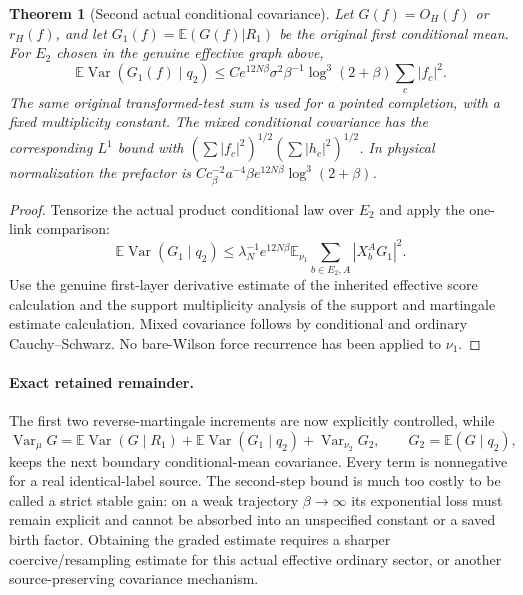 \documentclass[11pt]{article}
\newtheorem{theorem}{Theorem}
\newcommand{\E}{\mathbb E}
\newcommand{\Var}{\operatorname{Var}}
\begin{document}
\begin{theorem}[Second actual conditional covariance]
Let $G(f)=O_H(f)$ or $r_H(f)$, and let $G_1(f)=\E(G(f)|R_1)$ be the original first
conditional mean. For $E_2$ chosen in the genuine effective graph above,
\[
 \E\Var(G_1(f)\mid q_2)
 \le C e^{12N\beta}\sigma^2\beta^{-1}\log^3(2+\beta)
         \sum_c|f_c|^2.
\]
The same original transformed-test sum is used for a pointed completion, with a fixed
multiplicity constant. The mixed conditional covariance has the corresponding $L^1$
bound with $(\sum|f_c|^2)^{1/2}(\sum|h_c|^2)^{1/2}$.
In physical normalization the prefactor is
$C c_\beta^{-2}a^{-4}\beta e^{12N\beta}\log^3(2+\beta)$.
\end{theorem}
\begin{proof}
Tensorize the actual product conditional law over $E_2$ and apply the one-link comparison:
\[
 \E\Var(G_1\mid q_2)
 \le\lambda_N^{-1}e^{12N\beta}
       \E_{\nu_1}\sum_{b\in E_2,A}|X_b^AG_1|^2.
\]
Use the genuine first-layer derivative estimate of the inherited effective score calculation and the support
multiplicity analysis of the support and martingale estimate calculation. Mixed covariance follows by conditional and ordinary
Cauchy--Schwarz. No bare-Wilson force recurrence has been applied to $\nu_1$.
\end{proof}

\paragraph{Exact retained remainder.}
The first two reverse-martingale increments are now explicitly controlled, while
\[
 \Var_\mu G=\E\Var(G\mid R_1)
           +\E\Var(G_1\mid q_2)
           +\Var_{\nu_2}G_2,\qquad G_2=\E(G\mid q_2),
\]
keeps the next boundary conditional-mean covariance. Every term is nonnegative for a real
identical-label source. The second-step bound is much too costly to be called a strict
stable gain: on a weak trajectory $\beta\to\infty$ its exponential loss must remain
explicit and cannot be absorbed into an unspecified constant or a saved birth factor.
Obtaining the graded estimate requires a sharper coercive/resampling estimate for this
actual effective ordinary sector, or another source-preserving covariance mechanism.
\end{document}
